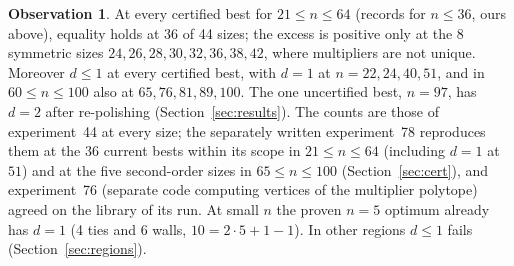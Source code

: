 \documentclass[11pt]{amsart}
\theoremstyle{definition}
\newtheorem{observation}[theorem]{Observation}
\begin{document}
\begin{observation}\label{obs:dof}
At every certified best for $21 \le n \le 64$ (records for $n \le 36$, ours above), equality holds at 36 of 44 sizes; the excess is positive only at the 8 symmetric sizes $24, 26, 28, 30, 32, 36, 38, 42$, where multipliers are not unique. Moreover $d \le 1$ at every certified best, with $d = 1$ at $n = 22, 24, 40, 51$, and in $60 \le n \le 100$ also at $65, 76, 81, 89, 100$. The one uncertified best, $n = 97$, has $d = 2$ after re-polishing (Section~\ref{sec:results}). %
The counts are those of experiment~44 at every size; the separately written experiment~78 reproduces them at the 36 current bests within its scope in $21 \le n \le 64$ (including $d = 1$ at $51$) and at the five second-order sizes in $65 \le n \le 100$ (Section~\ref{sec:cert}), and experiment~76 (separate code computing vertices of the multiplier polytope) agreed on the library of its run. At small $n$ the proven $n = 5$ optimum already has $d = 1$ (4 ties and 6 walls, $10 = 2\cdot5+1-1$). %
In other regions $d \le 1$ fails (Section~\ref{sec:regions}). %
\end{observation}
\end{document}
